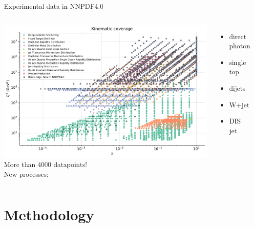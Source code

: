 \documentclass[aspectratio=169,9pt]{beamer}
\begin{document}
\begin{frame}{Experimental data in NNPDF4.0}
    \begin{columns}
            \includegraphics[width=1.0\textwidth]{Markers0_plot_xq2}
            More than 4000 datapoints!\\
            \vspace*{1em}
            New processes:
            \begin{itemize}
                \item direct photon
                \item single top
                \item dijets
                \item W+jet
                \item DIS jet
            \end{itemize}
    \end{columns}
\end{frame}



\section{Methodology}
\end{document}

